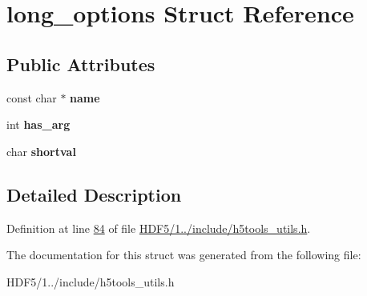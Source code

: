 \hypertarget{structlong__options}{}\section{long\+\_\+options Struct Reference}
\label{structlong__options}
\subsection*{Public Attributes}
\begin{DoxyCompactItemize}
\item 
\mbox{\label{structlong__options_a9c2feff852c42dc81bbb65028e405d28}} 
const char $\ast$ {\bfseries name}
\item 
\mbox{\label{structlong__options_a9dbf08dccb1c69f0b18a7a7d72ca9b17}} 
int {\bfseries has\+\_\+arg}
\item 
\mbox{\label{structlong__options_a38d3be270278fc07ea92edb72c5eb967}} 
char {\bfseries shortval}
\end{DoxyCompactItemize}


\subsection{Detailed Description}


Definition at line \hyperlink{_h_d_f5_21_810_81_2include_2h5tools__utils_8h_source_l00084}{84} of file \hyperlink{_h_d_f5_21_810_81_2include_2h5tools__utils_8h_source}{H\+D\+F5/1../include/h5tools\+\_\+utils.\+h}.



The documentation for this struct was generated from the following file\+:\begin{DoxyCompactItemize}
\item 
H\+D\+F5/1../include/h5tools\+\_\+utils.\+h\end{DoxyCompactItemize}
